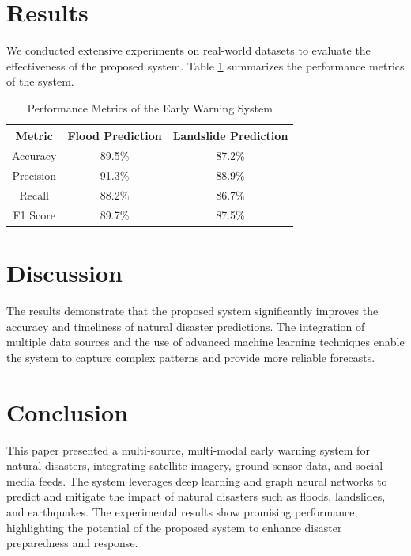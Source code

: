 \documentclass{article}
\begin{document}
\section{Results}
We conducted extensive experiments on real-world datasets to evaluate the effectiveness of the proposed system. Table \ref{tab:results} summarizes the performance metrics of the system.

\begin{table}[ht]
    \centering
    \begin{tabular}{|c|c|c|}
        \hline
        \textbf{Metric} & \textbf{Flood Prediction} & \textbf{Landslide Prediction} \\
        \hline
        Accuracy & 89.5\% & 87.2\% \\
        Precision & 91.3\% & 88.9\% \\
        Recall & 88.2\% & 86.7\% \\
        F1 Score & 89.7\% & 87.5\% \\
        \hline
    \end{tabular}
    \caption{Performance Metrics of the Early Warning System}
    \label{tab:results}
\end{table}

\section{Discussion}
The results demonstrate that the proposed system significantly improves the accuracy and timeliness of natural disaster predictions. The integration of multiple data sources and the use of advanced machine learning techniques enable the system to capture complex patterns and provide more reliable forecasts.

\section{Conclusion}
This paper presented a multi-source, multi-modal early warning system for natural disasters, integrating satellite imagery, ground sensor data, and social media feeds. The system leverages deep learning and graph neural networks to predict and mitigate the impact of natural disasters such as floods, landslides, and earthquakes. The experimental results show promising performance, highlighting the potential of the proposed system to enhance disaster preparedness and response.
\end{document}
